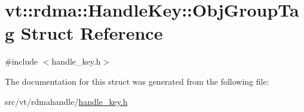 \hypertarget{structvt_1_1rdma_1_1_handle_key_1_1_obj_group_tag}{}\section{vt\+:\+:rdma\+:\+:Handle\+Key\+:\+:Obj\+Group\+Tag Struct Reference}
\label{structvt_1_1rdma_1_1_handle_key_1_1_obj_group_tag}


{\ttfamily \#include $<$handle\+\_\+key.\+h$>$}



The documentation for this struct was generated from the following file\+:\begin{DoxyCompactItemize}
\item 
src/vt/rdmahandle/\hyperlink{handle__key_8h}{handle\+\_\+key.\+h}\end{DoxyCompactItemize}
